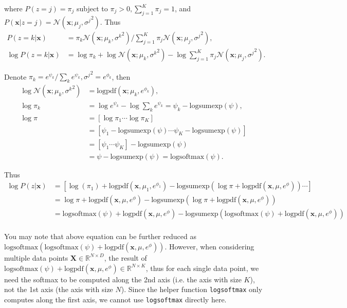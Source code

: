\documentclass[12pt]{article}
\begin{document}
where $P(z=j) = \pi_j$ subject to $\pi_j > 0, \sum_{j=1}^K \pi_j = 1$, and
$P(\mathbf{x}|z=j) = \mathcal{N}(\mathbf{x}; \mu_j, {\sigma^j}^2)$. Thus
\begin{align*}
P(z=k|\mathbf{x}) &= \pi_k \mathcal{N}(\mathbf{x}; \mu_k, {\sigma^k}^2) \Big/
    \sum_{j=1}^K \pi_j \mathcal{N}(\mathbf{x}; \mu_j, {\sigma^j}^2), \\
\log P(z=k|\mathbf{x}) &= \log\pi_k + \log \mathcal{N}(\mathbf{x}; \mu_k, {\sigma^k}^2)
    - \log \sum_{j=1}^K \pi_j \mathcal{N}(\mathbf{x}; \mu_j, {\sigma^j}^2).
\end{align*}

Denote $\pi_k = e^{\psi_k} / \sum_k e^{\psi_k}, {\sigma^j}^2 = e^{\phi_k}$, then
\begin{align*}
\log \mathcal{N}(\mathbf{x}; \mu_k, {\sigma^k}^2) &= \text{logpdf}(\mathbf{x}; \mu_k, e^{\phi_k}),\\
\log \pi_k &= \log e^{\psi_k} - \log \sum_k e^{\psi_k} 
    = \psi_k - \text{logsumexp}(\psi), \\
\log \pi &= [\log \pi_1 \cdots \log \pi_K] \\
    &= [\psi_1 - \text{logsumexp}(\psi) \cdots \psi_K - \text{logsumexp}(\psi)] \\
    &= [\psi_1 \cdots \psi_K] - \text{logsumexp}(\psi) \\
    &= \psi - \text{logsumexp}(\psi)
    = \text{logsoftmax}(\psi).
\end{align*}

Thus
\begin{align*}
\log P(z|\mathbf{x}) &= [\log(\pi_1) + \text{logpdf}(\mathbf{x}, \mu_1, e^{\phi_1}) - 
    \text{logsumexp}(\log\pi + \text{logpdf}(\mathbf{x}, \mu, e^{\phi})) \cdots ] \\
    &= \log\pi + \text{logpdf}(\mathbf{x}, \mu, e^\phi) 
    - \text{logsumexp}(\log\pi + \text{logpdf}(\mathbf{x}, \mu, e^{\phi})) \\
    &= \text{logsoftmax}(\psi) + \text{logpdf}(\mathbf{x}, \mu, e^\phi) 
    - \text{logsumexp}(\text{logsoftmax}(\psi) + \text{logpdf}(\mathbf{x}, \mu, e^{\phi})) \\
\end{align*}

You may note that above equation can be further reduced as
$\text{logsoftmax}(\text{logsoftmax}(\psi) + \text{logpdf}(\mathbf{x}, \mu, e^\phi))$. However, when considering multiple data points $\textbf{X} \in \mathbb{R}^{N \times D}$, 
the result of $\text{logsoftmax}(\psi) + \text{logpdf}(\mathbf{x}, \mu, e^\phi) \in \mathbb{R}^{N \times K}$, thus for each single data point, we need the softmax to be computed along the 2nd axis (i.e. the axis with size $K$), not the 1st axis (the axis with size $N$). Since the helper function \texttt{logsoftmax} only computes along the first axis, we cannot use \texttt{logsoftmax} directly here.
\end{document}
